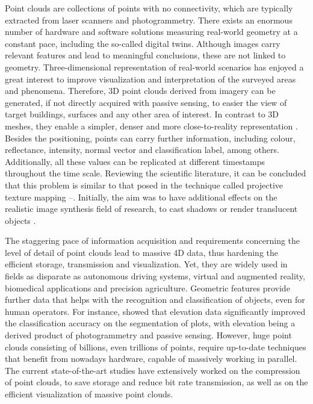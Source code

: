 Point clouds are collections of points with no connectivity, which are typically extracted from laser scanners and photogrammetry. There exists an enormous number of hardware and software solutions measuring real-world geometry at a constant pace, including the so-called digital twins. Although images carry relevant features and lead to meaningful conclusions, these are not linked to geometry. Three-dimensional representation of real-world scenarios has enjoyed a great interest to improve visualization and interpretation of the surveyed areas and phenomena. Therefore, 3D point clouds derived from imagery can be generated, if not directly acquired with passive sensing, to easier the view of target buildings, surfaces and any other area of interest. In contrast to 3D meshes, they enable a simpler, denser and more close-to-reality representation \cite{cao_3d_2019}. Besides the positioning, points can carry further information, including colour, reflectance, intensity, normal vector and classification label, among others. Additionally, all these values can be replicated at different timestamps throughout the time scale. Reviewing the scientific literature, it can be concluded that this problem is similar to that posed in the technique called projective texture mapping \cite{debevec_efficient_1998}–\cite{heckbert_survey_1986}. Initially, the aim was to have additional effects on the realistic image synthesis field of research, to cast shadows or render translucent objects \cite{dachsbacher_translucent_2003}.

The staggering pace of information acquisition and requirements concerning the level of detail of point clouds lead to massive 4D data, thus hardening the efficient storage, transmission and visualization. Yet, they are widely used in fields as disparate as autonomous driving systems, virtual and augmented reality, biomedical applications and precision agriculture. Geometric features provide further data that helps with the recognition and classification of objects, even for human operators. For instance, \cite{barros_multispectral_2022, kerkech_vine_2020, de_castro_3-d_2018} showed that elevation data significantly improved the classification accuracy on the segmentation of plots, with elevation being a derived product of photogrammetry and passive sensing. However, huge point clouds consisting of billions, even trillions of points, require up-to-date techniques that benefit from nowadays hardware, capable of massively working in parallel. The current state-of-the-art studies have extensively worked on the compression of point clouds, to save storage and reduce bit rate transmission, as well as on the efficient visualization of massive point clouds. 

